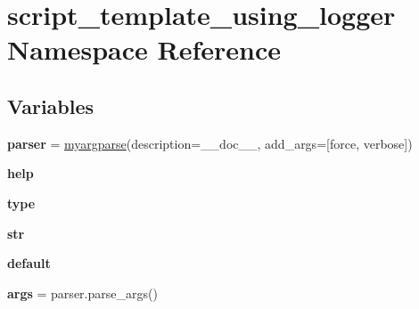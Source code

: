 \hypertarget{namespacescript__template__using__logger}{}\section{script\+\_\+template\+\_\+using\+\_\+logger Namespace Reference}
\label{namespacescript__template__using__logger}
\subsection*{Variables}
\begin{DoxyCompactItemize}
\item 
{\bfseries parser} = \hyperlink{classcommon_1_1arg__command__line_1_1myargparse}{myargparse}(description=\+\_\+\+\_\+doc\+\_\+\+\_\+, add\+\_\+args=\mbox{[}\textquotesingle{}force\textquotesingle{}, \textquotesingle{}verbose\textquotesingle{}\mbox{]})\hypertarget{namespacescript__template__using__logger_a95d351ba36bdd77e7469fc98e234a239}{}\label{namespacescript__template__using__logger_a95d351ba36bdd77e7469fc98e234a239}

\item 
{\bfseries help}\hypertarget{namespacescript__template__using__logger_ab7fb2ea1ddb8349a170c98a759fd6c81}{}\label{namespacescript__template__using__logger_ab7fb2ea1ddb8349a170c98a759fd6c81}

\item 
{\bfseries type}\hypertarget{namespacescript__template__using__logger_a9a5990205d9630d311ef2bb164903279}{}\label{namespacescript__template__using__logger_a9a5990205d9630d311ef2bb164903279}

\item 
{\bfseries str}\hypertarget{namespacescript__template__using__logger_a480698e3516c37d6edf48a49bd704a54}{}\label{namespacescript__template__using__logger_a480698e3516c37d6edf48a49bd704a54}

\item 
{\bfseries default}\hypertarget{namespacescript__template__using__logger_a7734ec0a43e2aa736d807f264b613271}{}\label{namespacescript__template__using__logger_a7734ec0a43e2aa736d807f264b613271}

\item 
{\bfseries args} = parser.\+parse\+\_\+args()\hypertarget{namespacescript__template__using__logger_a6d6eaafb9340d022712a5eddf0d72165}{}\label{namespacescript__template__using__logger_a6d6eaafb9340d022712a5eddf0d72165}


\end{DoxyCompactItemize}
